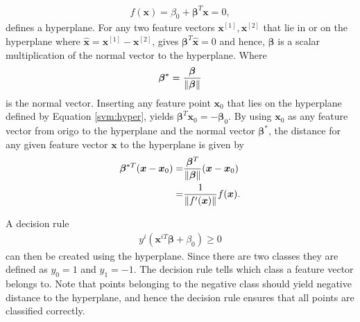             \begin{align}
                f(\bm x) = \beta_0 + \bm \beta^T\bm x = 0,
                \label{svm:hyper}
            \end{align}
            defines a hyperplane. For any two feature vectors $\bm x^{[1]},\bm x^{[2]}$ that lie in or on the hyperplane where $\bm \hat x = \bm x^{[1]} - \bm x^{[2]}$, gives  $\bm \beta^T \bm{\hat x} = 0 $ and hence, $\bm \beta$ is a scalar multiplication of the normal vector to the hyperplane. Where
            \begin{align}
                \bm \beta^* = \frac{\bm \beta}{\lVert\bm \beta\rVert}
                \label{svm:norm}
            \end{align}
            is the normal vector. Inserting any feature point $\bm x_0$ that lies on the hyperplane defined by Equation \ref{svm:hyper}, yields $\bm \beta^T\bm x_0 = -\bm \beta_0$. By using $\bm x_0$ as any feature vector from origo to the hyperplane and the normal vector $\bm \beta^*$, the distance for any given feature vector $\bm x$ to the hyperplane is given by
            \begin{align}
                \bm \beta^{*T}(\bm x - \bm x_0) = & \frac{\bm \beta^T}{\lVert\bm \beta\rVert} (\bm x - \bm x_0) \nonumber \\
                = & \frac{1}{\lVert f'(\bm x)\rVert}f(\bm x).
                \label{svm:dist}
            \end{align}
            
            A decision rule 
            \begin{align}
                y^i(\bm x^{iT} \bm \beta + \beta_0) \geq 0 
                \label{svm:decision}
            \end{align}
            can then be created using the hyperplane. Since there are two classes they are defined as $y_0 = 1$ and $y_1 = -1$. The decision rule tells which class a feature vector belongs to. Note that points belonging to the negative class should yield negative distance to the hyperplane, and hence the decision rule ensures that all points are classified correctly.
            
